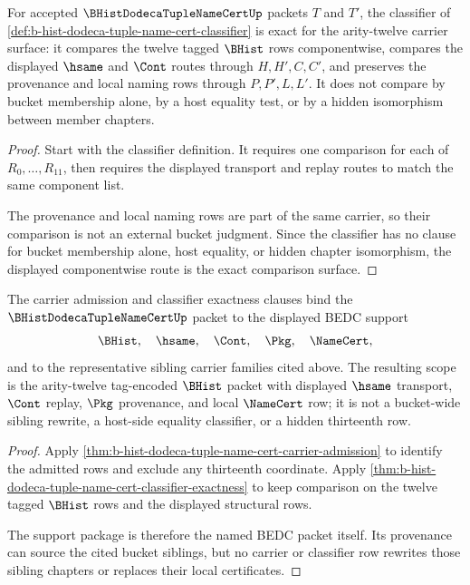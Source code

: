 \begin{theorem}
\label{thm:b-hist-dodeca-tuple-name-cert-classifier-exactness}
For accepted $\BHistDodecaTupleNameCertUp$ packets $T$ and $T'$, the classifier of \autoref{def:b-hist-dodeca-tuple-name-cert-classifier} is exact for the arity-twelve carrier surface: it compares the twelve tagged $\BHist$ rows componentwise, compares the displayed $\hsame$ and $\Cont$ routes through $H,H',C,C'$, and preserves the provenance and local naming rows through $P,P',L,L'$. It does not compare by bucket membership alone, by a host equality test, or by a hidden isomorphism between member chapters.
\end{theorem}
\begin{proof}
Start with the classifier definition. It requires one comparison for each of $R_0,\ldots,R_{11}$, then requires the displayed transport and replay routes to match the same component list.

The provenance and local naming rows are part of the same carrier, so their comparison is not an external bucket judgment. Since the classifier has no clause for bucket membership alone, host equality, or hidden chapter isomorphism, the displayed componentwise route is the exact comparison surface.
\end{proof}

\begin{theorem}
\label{thm:b-hist-dodeca-tuple-name-cert-scoped-support-package}
The carrier admission and classifier exactness clauses bind the $\BHistDodecaTupleNameCertUp$ packet to the displayed BEDC support
$$
\BHist,\quad \hsame,\quad \Cont,\quad \Pkg,\quad \NameCert,
$$
and to the representative sibling carrier families cited above. The resulting scope is the arity-twelve tag-encoded $\BHist$ packet with displayed $\hsame$ transport, $\Cont$ replay, $\Pkg$ provenance, and local $\NameCert$ row; it is not a bucket-wide sibling rewrite, a host-side equality classifier, or a hidden thirteenth row.
\end{theorem}
\begin{proof}
Apply \autoref{thm:b-hist-dodeca-tuple-name-cert-carrier-admission} to identify the admitted rows and exclude any thirteenth coordinate. Apply \autoref{thm:b-hist-dodeca-tuple-name-cert-classifier-exactness} to keep comparison on the twelve tagged $\BHist$ rows and the displayed structural rows.

The support package is therefore the named BEDC packet itself. Its provenance can source the cited bucket siblings, but no carrier or classifier row rewrites those sibling chapters or replaces their local certificates.
\end{proof}

